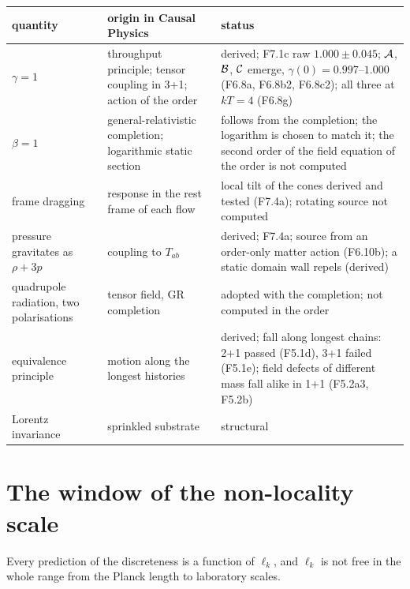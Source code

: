 \begin{center}
\begin{tabularx}{\linewidth}{>{\raggedright\arraybackslash}p{3.6cm}>{\raggedright\arraybackslash}X>{\raggedright\arraybackslash}p{4.6cm}}
\toprule
quantity & origin in Causal Physics & status\\
\midrule
$\gamma=1$ & throughput principle; tensor coupling in 3+1; action of the order & derived; F7.1c raw $1.000\pm0.045$; $\mathcal{A}$, $\mathcal{B}$, $\mathcal{C}$ emerge, $\gamma(0)=0.997$--$1.000$ (F6.8a, F6.8b2, F6.8c2); all three at $kT=4$ (F6.8g)\\
$\beta=1$ & general-relativistic completion; logarithmic static section & follows from the completion; the logarithm is chosen to match it; the second order of the field equation of the order is not computed\\
frame dragging & response in the rest frame of each flow & local tilt of the cones derived and tested (F7.4a); rotating source not computed\\
pressure gravitates as $\rho+3p$ & coupling to $T_{ab}$ & derived; F7.4a; source from an order-only matter action (F6.10b); a static domain wall repels (derived)\\
quadrupole radiation, two polarisations & tensor field, GR completion & adopted with the completion; not computed in the order\\
equivalence principle & motion along the longest histories & derived; fall along longest chains: 2+1 passed (F5.1d), 3+1 failed (F5.1e); field defects of different mass fall alike in 1+1 (F5.2a3, F5.2b)\\
Lorentz invariance & sprinkled substrate & structural\\
\bottomrule
\end{tabularx}
\end{center}

\section{The window of the non-locality scale}\label{sec:window}

Every prediction of the discreteness is a function of $\ell_k$, and $\ell_k$ is not free in the whole range
from the Planck length to laboratory scales.

